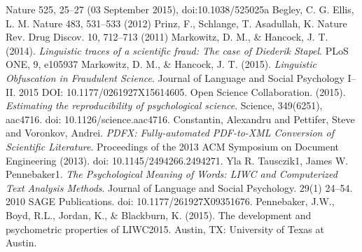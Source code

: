 \documentclass[12pt]{article}
\newcounter{lastnote}
\begin{document}
\pagebreak

%

\begin{thebibliography}{9}
 Nature 525, 25–27 (03 September 2015), doi:10.1038/525025a
 Begley, C. G. Ellis, L. M. Nature 483, 531–533 (2012)
 Prinz, F., Schlange, T.  Asadullah, K. Nature Rev. Drug Discov. 10, 712–713 (2011)
 Markowitz, D. M., \& Hancock, J. T. (2014). \emph{Linguistic traces of a scientific fraud: The case of Diederik Stapel}. PLoS ONE, 9, e105937
 Markowitz, D. M., \& Hancock, J. T. (2015). \emph{Linguistic Obfuscation in Fraudulent Science}. Journal of Language and Social Psychology I–II. 2015 DOI: 10.1177/0261927X15614605.
 Open Science Collaboration. (2015). \emph{Estimating the reproducibility of psychological science}. Science, 349(6251), aac4716. doi: 10.1126/science.aac4716.
 Constantin, Alexandru and Pettifer, Steve and Voronkov, Andrei. \emph{PDFX: Fully-automated PDF-to-XML Conversion of Scientific Literature}. Proceedings of the 2013 ACM Symposium on Document Engineering (2013). doi: 10.1145/2494266.2494271.
 Yla R. Tausczik1, James W. Pennebaker1. \emph{The Psychological Meaning of Words: LIWC and Computerized Text Analysis Methods}. Journal of Language and Social Psychology. 29(1) 24–54. 2010 SAGE Publications. doi: 10.1177/261927X09351676.
 Pennebaker, J.W., Boyd, R.L., Jordan, K., \& Blackburn, K. (2015). The development and psychometric properties of LIWC2015. Austin, TX: University of Texas at Austin.




\end{thebibliography}
\pagebreak
\end{document}
